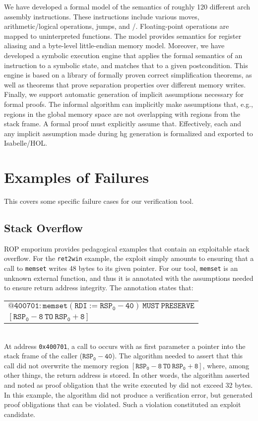We have developed a formal model of the semantics of roughly \num{120} different \gls{arch} assembly instructions.
These instructions include various moves, arithmetic/logical operations, jumps, and /.
Floating-point operations are mapped to uninterpreted functions.
The model provides semantics for register aliasing and a byte-level little-endian memory model.
Moreover, we have developed a symbolic execution engine that applies the formal semantics of an instruction to a symbolic state, and matches that to a given postcondition.
This engine is based on a library of formally proven correct simplification theorems, as well as theorems that prove separation properties over different memory writes.
Finally, we support automatic generation of implicit assumptions necessary for formal proofs.
The informal algorithm can implicitly make assumptions that, e.g., regions in the global memory space are not overlapping with regions from the stack frame.
A formal proof must explicitly assume that.
Effectively, each and any implicit assumption made during \ac{hg} generation is formalized and exported to Isabelle/HOL.

\section{Examples of Failures}\label{sec:not-me-failures}
This  covers some specific failure cases for our verification tool.

\subsection{Stack Overflow}
ROP emporium provides pedagogical examples that contain an exploitable stack overflow.
For the \texttt{ret2win} example, the exploit simply amounts to ensuring that a call to \texttt{memset} writes 48 bytes to its given pointer.
For our tool, \texttt{memset} is an unknown external function, and thus it is annotated with the assumptions needed to ensure return address integrity.
The annotation states that:
\\[1ex]
\begin{tabular}{l}
  $\mathtt{@400701: memset(RDI:=RSP_0 - 40)~MUST~PRESERVE }$\\
  \hspace{32ex}$\mathtt{ [ RSP_0 - 8~TO~RSP_0 + 8 ]}$
\end{tabular}
\\[1ex]
At address \texttt{0x400701}, a call to  occurs with as first parameter a pointer into the stack frame of the caller ($\mathtt{RSP_0 - 40}$).
The algorithm needed to assert that this call did not overwrite the memory region $\mathtt{[ RSP_0 - 8 ~TO~ RSP_0 + 8 ]}$, where, among other things, the return address is stored.
In other words, the algorithm asserted and noted as proof obligation that the write executed by  did not exceed 32 bytes.
In this example, the algorithm did not produce a verification error, but generated proof obligations that can be violated. Such a violation constituted an exploit candidate.

